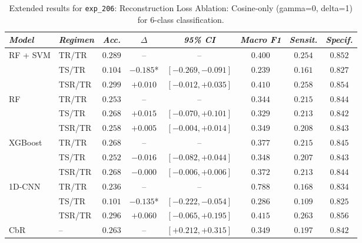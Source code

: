 \begin{table}[H]
\centering
\scriptsize
\caption{Extended results for \texttt{exp\_206}: Reconstruction Loss Ablation: Cosine-only (gamma=0, delta=1) for 6-class classification.}
\label{tab:appendix_exp_206}
\begin{tabular*}{\textwidth}{@{\extracolsep{\fill}}llcccccc}
\toprule
\emph{Model} & \emph{Regimen} & \emph{Acc.} & \emph{$\Delta$} & \emph{95\% CI} & \emph{Macro F1} & \emph{Sensit.} & \emph{Specif.}\\
\midrule
\multirow{3}{*}{RF + SVM} & TR/TR & $0.289$ & -- & -- & $0.400$ & $0.254$ & $0.852$\\
 & TS/TR & $0.104$ & $-0.185$* & $[-0.269, -0.091]$ & $0.239$ & $0.161$ & $0.827$\\
 & TSR/TR & $0.299$ & $+0.010$ & $[-0.012, +0.035]$ & $0.410$ & $0.258$ & $0.854$\\
\midrule
\multirow{3}{*}{RF} & TR/TR & $0.253$ & -- & -- & $0.344$ & $0.215$ & $0.844$\\
 & TS/TR & $0.268$ & $+0.015$ & $[-0.070, +0.101]$ & $0.329$ & $0.213$ & $0.842$\\
 & TSR/TR & $0.258$ & $+0.005$ & $[-0.004, +0.014]$ & $0.349$ & $0.208$ & $0.843$\\
\midrule
\multirow{3}{*}{XGBoost} & TR/TR & $0.268$ & -- & -- & $0.377$ & $0.215$ & $0.845$\\
 & TS/TR & $0.252$ & $-0.016$ & $[-0.082, +0.044]$ & $0.348$ & $0.207$ & $0.843$\\
 & TSR/TR & $0.268$ & $-0.000$ & $[-0.006, +0.006]$ & $0.372$ & $0.213$ & $0.844$\\
\midrule
\multirow{3}{*}{1D-CNN} & TR/TR & $0.236$ & -- & -- & $0.788$ & $0.168$ & $0.834$\\
 & TS/TR & $0.101$ & $-0.135$* & $[-0.222, -0.054]$ & $0.286$ & $0.109$ & $0.825$\\
 & TSR/TR & $0.296$ & $+0.060$ & $[-0.065, +0.195]$ & $0.415$ & $0.263$ & $0.856$\\
\midrule
CbR & -- & $0.263$ & -- & $[+0.212, +0.315]$ & $0.349$ & $0.197$ & $0.842$\\
\bottomrule
\end{tabular*}
\end{table}

